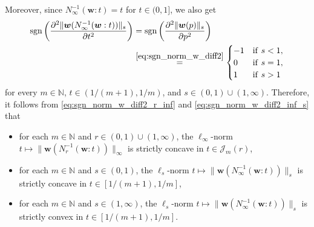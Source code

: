 \documentclass[conference, draftcls, onecolumn]{IEEEtran}
\theoremstyle{plain}
\newcommand{\bvec}[1]{\boldsymbol{#1}}
\newcommand{\sgn}{\operatorname{sgn}}
\newcommand{\lemref}[1]{Lemma~\ref{#1}}
\begin{document}
\begin{IEEEproof}[Proof of \lemref{lem:convex_w}]
Moreover, since $N_{\infty}^{-1}( \bvec{w} : t ) = t$ for $t \in (0, 1]$, we also get
\begin{align}
\sgn\bigg( \frac{ \partial^{2} \| \bvec{w}( N_{\infty}^{-1}( \bvec{w} : t ) ) \|_{s} }{ \partial t^{2} } \bigg)
& =
\sgn\bigg( \frac{ \partial^{2} \| \bvec{w}( p ) \|_{s} }{ \partial p^{2} } \bigg)
\\
& \overset{\eqref{eq:sgn_norm_w_diff2}}{=}
\begin{cases}
-1
& \mathrm{if} \ s < 1 ,
\\
0
& \mathrm{if} \ s = 1 ,
\\
1
& \mathrm{if} \ s > 1
\end{cases}
\label{eq:sgn_norm_w_diff2_inf_s}
\end{align}
for every $m \in \mathbb{N}$, $t \in (1/(m+1), 1/m)$, and $s \in (0, 1) \cup (1, \infty)$.
Therefore, it follows from \eqref{eq:sgn_norm_w_diff2_r_inf} and \eqref{eq:sgn_norm_w_diff2_inf_s} that
\begin{itemize}
\item
for each $m \in \mathbb{N}$ and $r \in (0, 1) \cup (1, \infty)$, the $\ell_{\infty}$-norm $t \mapsto \| \bvec{w}( N_{r}^{-1}( \bvec{w} : t ) ) \|_{\infty}$ is strictly concave in $t \in \mathcal{J}_{m}( r )$,
\item
for each $m \in \mathbb{N}$ and $s \in (0, 1)$, the $\ell_{s}$-norm $t \mapsto \| \bvec{w}( N_{\infty}^{-1}( \bvec{w} : t ) ) \|_{s}$ is strictly concave in $t \in [1/(m+1), 1/m]$,
\item
for each $m \in \mathbb{N}$ and $s \in (1, \infty)$, the $\ell_{s}$-norm $t \mapsto \| \bvec{w}( N_{\infty}^{-1}( \bvec{w} : t ) ) \|_{s}$ is strictly convex in $t \in [1/(m+1), 1/m]$.
\end{itemize}



\end{IEEEproof}
\end{document}
